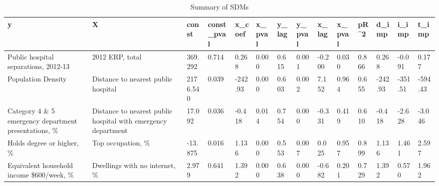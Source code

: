 \hspace{-1cm}
\begin{table}[h!]
\fontsize{8}{6}\selectfont %
\setlength{\tabcolsep}{2pt} %
\renewcommand{\arraystretch}{1.5} %
\begin{tabular}{|p{2cm}|p{2cm}|p{1.5cm}|p{1.5cm}|p{1cm}|p{1cm}|p{1cm}|p{1cm}|p{1cm}|p{1cm}|p{1cm}|p{1cm}|p{1cm}|p{1cm}|} %
\hline
y & X & const & const\_pval & x\_coef & x\_pval & y\_lag & y\_pval & x\_lag & x\_pval & pR\^{}2 & d\_imp & i\_imp & t\_imp \\
\hline
Public hospital separations, 2012-13 & 2012 ERP, total & 369.292 & 0.714 & 0.268 & 0.000 & 0.615 & 0.001 & -0.200 & 0.030 & 0.866 & 0.268 & -0.091 & 0.177 \\
\hline
Population Density & Distance to nearest public hospital & 2176.540 & 0.039 & -242.93 & 0.000 & 0.603 & 0.002 & 7.152 & 0.964 & 0.655 & -242.93 & -351.51 & -594.43 \\
\hline
Category 4 \& 5 emergency department presentations, \% & Distance to nearest public hospital with emergency department & 17.092 & 0.036 & -0.418 & 0.014 & 0.754 & 0.000 & -0.331 & 0.419 & 0.610 & -0.418 & -2.628 & -3.046 \\
\hline
Holds degree or higher, \% & Top occupation, \% & -13.875 & 0.016 & 1.136 & 0.000 & 0.553 & 0.007 & 0.025 & 0.957 & 0.899 & 1.136 & 1.461 & 2.597 \\
\hline
Equivalent household income \$600/week, \% & Dwellings with no internet, \% & 2.979 & 0.641 & 1.392 & 0.000 & 0.638 & 0.000 & -0.682 & 0.201 & 0.729 & 1.392 & 0.570 & 1.962 \\
\hline
\end{tabular}
\caption{Summary of SDMs}
\label{tab:summary_SDM}
\end{table}
